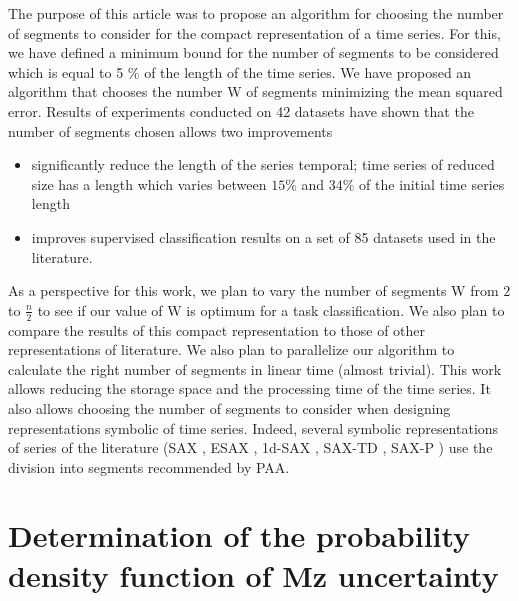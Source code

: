 The purpose of this article was to propose an algorithm for choosing the number of segments to consider for the compact representation of a time series. For this, we have defined a minimum bound for the number of segments to be considered which is equal to 5 \% of the length of the time series. We have proposed an algorithm that chooses the number W of segments minimizing the mean squared error. Results of experiments conducted on 42 datasets
 have shown that the number of segments chosen allows two improvements
 \begin{itemize}
\item significantly reduce the length of the series
temporal; time series of reduced size has a length
which varies between $ 15 \% $ and $ 34 \% $ of the initial time series length
\item improves supervised classification results on a set of 85 datasets
used in the literature. 
\end{itemize}
As a perspective for this work, we plan to vary the number of
segments W from $ 2 $ to $ \frac{n}{2} $ to see if our value of W is optimum for a task classification. We also plan to compare the results of this compact representation to
those of other representations of literature. We also plan to parallelize our algorithm to calculate the right number of segments in linear time (almost trivial). This work allows
reducing the storage space and the processing time of the time series. It also allows choosing the number of segments to consider when designing representations
symbolic of time series. Indeed, several symbolic representations of series
of the literature (SAX \cite{lin2003symbolic}, ESAX \cite{lkhagva2006extended}, 1d-SAX \cite{Malinowski2013},
SAX-TD \cite{sun2014improvement}, SAX-P \cite{siyou2015}) use the division into segments recommended by PAA.
\label{conclusion}



















\chapter{Determination of the probability density function of Mz  uncertainty}
\label{pdf_uncertainty}


